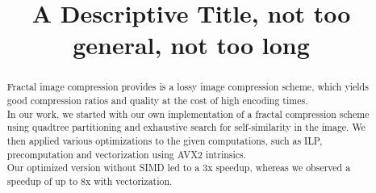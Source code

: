 \documentclass[letterpaper]{article}
\title{A Descriptive Title, not too general, not too long}
\begin{document}
%
\maketitle
%

\begin{abstract}
    Fractal image compression provides is a lossy image compression scheme,
    which yields good compression ratios and quality at the cost of high encoding times.\\
    In our work, we started with our own implementation of a fractal compression scheme using quadtree partitioning
    and exhaustive search for self-similarity in the image. 
    We then applied various optimizations to the given computations, such as ILP, precomputation and vectorization using AVX2 intrinsics.\\
    Our optimized version without SIMD led to a 3x speedup, whereas we observed a speedup of up to 8x with vectorization.
\end{abstract}










\end{document}

